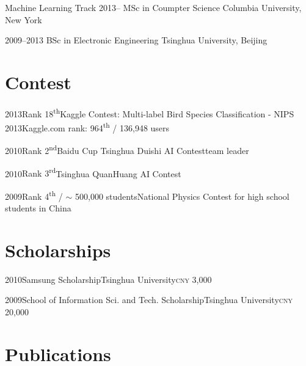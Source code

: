 \documentclass{tccv}
\begin{document}
\begin{yearlist}

\item[Machine Learning Track]{2013--}
     {MSc in Coumpter Science}
     {Columbia University, New York}{}{}

\item[]{2009--2013}
     {BSc in Electronic Engineering}
     {Tsinghua University, Beijing}{}{}



\end{yearlist}

\section{Contest}

\begin{yearlist}

\item{2013}{Rank 18\textsuperscript{th}}{Kaggle Contest: Multi-label Bird Species Classification - NIPS 2013}{Kaggle.com rank: 964\textsuperscript{th} / 136,948 users}{}

\item{2010}{Rank 2\textsuperscript{nd}}{Baidu Cup Tsinghua Duishi AI Contest}{}{team leader}

\item{2010}{Rank 3\textsuperscript{rd}}{Tsinghua QuanHuang AI Contest}{}{}

\item{2009}{Rank 4\textsuperscript{th} / $\sim$ 500,000 students}{National Physics Contest for high school students in China}{}{}



\end{yearlist}

\section{Scholarships}

\begin{yearlist}

\item{2010}{Samsung Scholarship}{Tsinghua University}{}{\textsc{cny} 3,000}
\item{2009}{School of Information Sci. and Tech. Scholarship}{Tsinghua University}{}{\textsc{cny} 20,000}


\end{yearlist}

\section{Publications}
\end{document}
